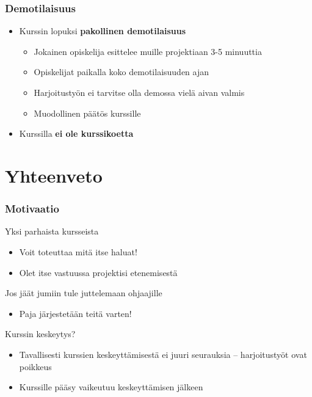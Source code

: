 \documentclass[finnish]{beamer}
\begin{document}
	\begin{frame}
		\frametitle{Demotilaisuus}
		\begin{itemize}
			\item Kurssin lopuksi \textbf{pakollinen demotilaisuus}
			\begin{itemize}
				\item Jokainen opiskelija esittelee muille projektiaan 3-5 minuuttia
				\item Opiskelijat paikalla koko demotilaisuuden ajan
				\item Harjoitustyön ei tarvitse olla demossa vielä aivan valmis
				\item Muodollinen päätös kurssille
			\end{itemize}
			\item Kurssilla \textbf{ei ole kurssikoetta}
		\end{itemize}
	\end{frame}
	
	\section{Yhteenveto}
	
	\begin{frame}
		\frametitle{Motivaatio}

		Yksi parhaista kursseista
		\begin{itemize}
			\item Voit toteuttaa mitä itse haluat!
			\item Olet itse vastuussa projektisi etenemisestä
		\end{itemize}		
		
		Jos jäät jumiin tule juttelemaan ohjaajille
		\begin{itemize}
			\item Paja järjestetään teitä varten!
		\end{itemize}
		
		Kurssin keskeytys?
		\begin{itemize}
			\item Tavallisesti kurssien keskeyttämisestä ei juuri seurauksia -- harjoitustyöt ovat poikkeus
			\item Kurssille pääsy vaikeutuu keskeyttämisen jälkeen
		\end{itemize}
	\end{frame}
	
\end{document}
